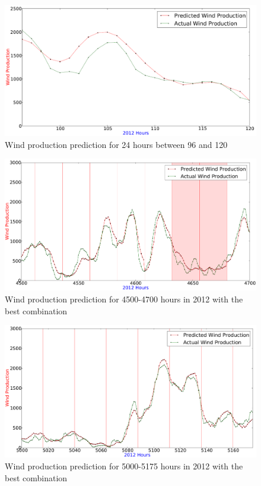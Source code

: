 \begin{figure}[H]
\centering
\includegraphics[width=0.99\linewidth]{billeder/bestInputCombi96-120.png}
\caption{Wind production prediction for 24 hours between 96 and 120}
\label{fig:bestInputCombi96-120}
\end{figure}   

\begin{figure}[H]
\centering
\includegraphics[width=0.99\linewidth]{billeder/bestInputCombi4500-4700.png}
\caption{Wind production prediction for 4500-4700 hours in 2012 with the best combination}
\label{fig:bestInputCombi4500-4700}
\end{figure} 

\begin{figure}[H]
\centering
\includegraphics[width=0.99\linewidth]{billeder/bestInputParameterLowNumbers.png}
\caption{Wind production prediction for 5000-5175 hours in 2012 with the best combination}
\label{fig:bestInputParameterLowNumbers}
\end{figure}   

